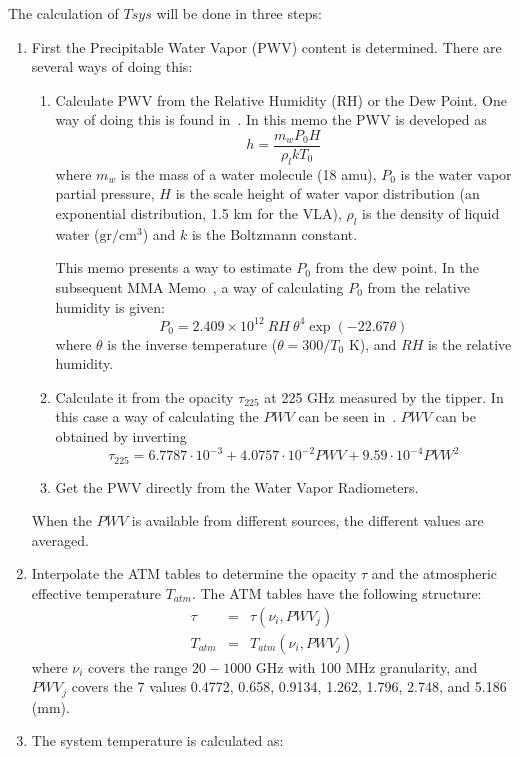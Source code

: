 The calculation of $Tsys$ will be done in three steps:
\begin{enumerate}
\item First the Precipitable Water Vapor (PWV) content is determined. There are
several ways of doing this:
\begin{enumerate}
\item Calculate PWV from the Relative Humidity (RH) or the Dew Point. One way
of doing this is found in~\cite{butler98}. In this memo the PWV is developed as
$$
h = \frac{m_w P_0 H}{\rho_l k T_0}
$$
where $m_w$ is the mass of a water molecule (18 amu), $P_0$ is the water vapor
partial pressure, $H$ is the scale height of water vapor distribution (an
exponential distribution, 1.5 km for the VLA), $\rho_l$ is the density of
liquid water ($\mathrm{gr}/\mathrm{cm}^3$) and $k$ is the Boltzmann constant.

This memo presents a way to estimate $P_0$ from the dew point. In the subsequent
MMA Memo~\cite{butler98_1}, a way of calculating
$P_0$ from the relative humidity is given:
$$
P_0 = 2.409 \times 10^{12} \ RH\ \theta^4 \exp(-22.67\theta)
$$
where $\theta$ is the inverse temperature ($\theta = 300/T_0 $ K), and $RH$ is
the relative humidity.

\item Calculate it from the opacity $\tau_{225}$ at 225 GHz measured by the
tipper. In this case a way of calculating the $PWV$ can be seen in~\cite{delgado99}. $PWV$ can be obtained
by inverting
$$
\tau_{225} = 6.7787\cdot 10^{-3} + 4.0757\cdot 10^{-2} PWV + 9.59\cdot 10^{-4} PVW^2
$$
\item Get the PWV directly from the Water Vapor Radiometers.
\end{enumerate}
When the $PWV$ is available from different sources, the different values
are averaged.

\item Interpolate the ATM tables to determine the opacity $\tau$ and the
atmospheric effective temperature $T_{atm}$. The ATM tables have the following structure:
\begin{eqnarray*}
\tau & = & \tau(\nu_i, PWV_j) \\
T_{atm} & = & T_{atm}(\nu_i, PWV_j)
\end{eqnarray*}
where $\nu_i$ covers the range $20-1000$ GHz with 100 MHz granularity, and $PWV_j$
covers the 7 values 0.4772, 0.658, 0.9134, 1.262, 1.796, 2.748, and 5.186 (mm). 
\item The system temperature is calculated as:


\end{enumerate}
